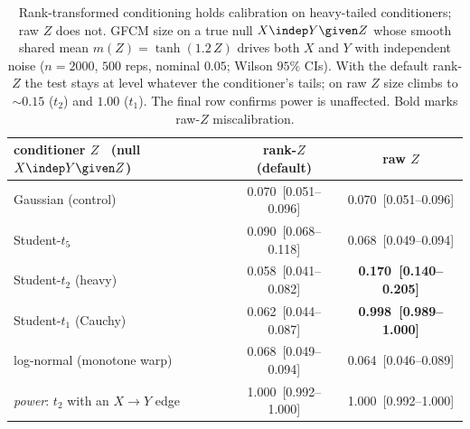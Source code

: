 \begin{table}[ht]\centering
\small
\begin{tabular}{lcc}
\toprule
conditioner $Z$ \ (null $X\indep Y\given Z$) & rank-$Z$ (default) & raw $Z$ \\
\midrule
Gaussian (control) & 0.070~[0.051--0.096] & 0.070~[0.051--0.096] \\
Student-$t_5$ & 0.090~[0.068--0.118] & 0.068~[0.049--0.094] \\
Student-$t_2$ (heavy) & 0.058~[0.041--0.082] & \textbf{0.170~[0.140--0.205]} \\
Student-$t_1$ (Cauchy) & 0.062~[0.044--0.087] & \textbf{0.998~[0.989--1.000]} \\
log-normal (monotone warp) & 0.068~[0.049--0.094] & 0.064~[0.046--0.089] \\
\midrule
\textit{power}: $t_2$ with an $X\!\to\!Y$ edge & 1.000~[0.992--1.000] & 1.000~[0.992--1.000] \\
\bottomrule
\end{tabular}
\caption{Rank-transformed conditioning holds calibration on heavy-tailed conditioners; raw $Z$ does not. GFCM size on a true null $X\indep Y\given Z$ whose smooth shared mean $m(Z)=\tanh(1.2\,Z)$ drives both $X$ and $Y$ with independent noise ($n=2000$, $500$ reps, nominal $0.05$; Wilson $95\%$ CIs). With the default rank-$Z$ the test stays at level whatever the conditioner's tails; on raw $Z$ size climbs to $\sim0.15$ ($t_2$) and $1.00$ ($t_1$). The final row confirms power is unaffected. Bold marks raw-$Z$ miscalibration.}
\label{tab:rankz}
\end{table}
